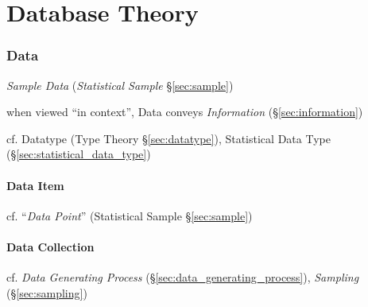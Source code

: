 \part{Database Theory}\label{part:database_theory}

\section{Data}\label{sec:data}

\emph{Sample Data} (\emph{Statistical Sample} \S\ref{sec:sample})

when viewed ``in context'', Data conveys \emph{Information}
(\S\ref{sec:information})

\fist cf. Datatype (Type Theory \S\ref{sec:datatype}), Statistical Data Type
(\S\ref{sec:statistical_data_type})



\subsection{Data Item}\label{sec:data_item}

cf. ``\emph{Data Point}'' (Statistical Sample \S\ref{sec:sample})



\subsection{Data Collection}\label{sec:data_collection}

cf. \emph{Data Generating Process} (\S\ref{sec:data_generating_process}),
\emph{Sampling} (\S\ref{sec:sampling})



